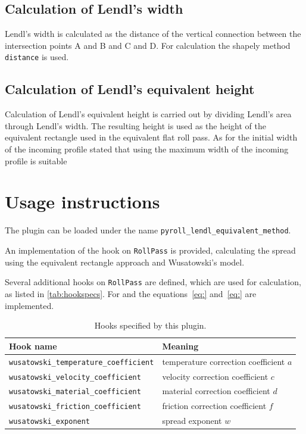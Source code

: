 \documentclass[11pt]{PyRollDocs}
\begin{document}
    \newpage

    \subsection{Calculation of Lendl's width}\label{subsec:lendl-width}
    Lendl's width is calculated as the distance of the vertical connection between the intersection points A and B and C and D.
    For calculation the shapely method \texttt{distance} is used.

    \subsection{Calculation of Lendl's equivalent height}\label{subsec:lendl-height}
    Calculation of Lendl's equivalent height is carried out by dividing Lendl's area through Lendl's width.
    The resulting height is used as the height of the equivalent rectangle used in the equivalent flat roll pass.
    As for the initial width of the incoming profile \textcite{Mauk_Kopp_1982} stated that using the maximum width of the incoming profile is suitable


    \section{Usage instructions}\label{sec:usage-instructions}

    The plugin can be loaded under the name \texttt{pyroll\_lendl\_equivalent\_method}.

    An implementation of the \lstinline{} hook on \lstinline{RollPass} is provided,
    calculating the spread using the equivalent rectangle approach and Wusatowski's model.

    Several additional hooks on \lstinline{RollPass} are defined, which are used for calculation, as listed in \autoref{tab:hookspecs}.
    For \lstinline{} and \lstinline{} the equations~\ref{eq:} and~\ref{eq:} are implemented.

    \begin{table}
        \centering
        \caption{Hooks specified by this plugin.}
        \label{tab:hookspecs}
        \begin{tabular}{ll}
            \toprule
            Hook name                                     & Meaning                                \\
            \midrule
            \texttt{wusatowski\_temperature\_coefficient} & temperature correction coefficient $a$ \\
            \texttt{wusatowski\_velocity\_coefficient}    & velocity correction coefficient $c$    \\
            \texttt{wusatowski\_material\_coefficient}    & material correction coefficient $d$    \\
            \texttt{wusatowski\_friction\_coefficient}    & friction correction coefficient $f$    \\
            \texttt{wusatowski\_exponent}                 & spread exponent $w$                    \\
            \bottomrule
        \end{tabular}
    \end{table}

    \printbibliography
\end{document}
